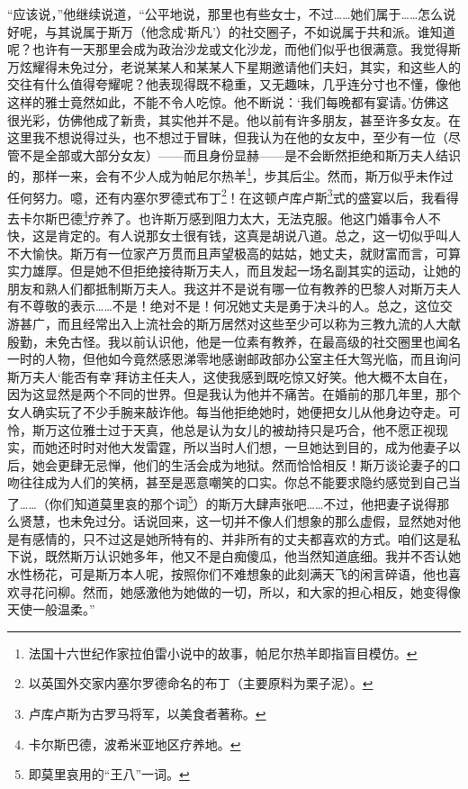 \par “应该说，”他继续说道，“公平地说，那里也有些女士，不过……她们属于……怎么说好呢，与其说属于斯万（他念成‘斯凡’）的社交圈子，不如说属于共和派。谁知道呢？也许有一天那里会成为政治沙龙或文化沙龙，而他们似乎也很满意。我觉得斯万炫耀得未免过分，老说某某人和某某人下星期邀请他们夫妇，其实，和这些人的交往有什么值得夸耀呢？他表现得既不稳重，又无趣味，几乎连分寸也不懂，像他这样的雅士竟然如此，不能不令人吃惊。他不断说：‘我们每晚都有宴请。’仿佛这很光彩，仿佛他成了新贵，其实他并不是。他以前有许多朋友，甚至许多女友。在这里我不想说得过头，也不想过于冒昧，但我认为在他的女友中，至少有一位（尽管不是全部或大部分女友）——而且身份显赫——是不会断然拒绝和斯万夫人结识的，那样一来，会有不少人成为帕尼尔热羊\footnote{法国十六世纪作家拉伯雷小说中的故事，帕尼尔热羊即指盲目模仿。}，步其后尘。然而，斯万似乎未作过任何努力。噫，还有内塞尔罗德式布丁\footnote{以英国外交家内塞尔罗德命名的布丁（主要原料为栗子泥）。}！在这顿卢库卢斯\footnote{卢库卢斯为古罗马将军，以美食者著称。}式的盛宴以后，我看得去卡尔斯巴德\footnote{卡尔斯巴德，波希米亚地区疗养地。}疗养了。也许斯万感到阻力太大，无法克服。他这门婚事令人不快，这是肯定的。有人说那女士很有钱，这真是胡说八道。总之，这一切似乎叫人不大愉快。斯万有一位家产万贯而且声望极高的姑姑，她丈夫，就财富而言，可算实力雄厚。但是她不但拒绝接待斯万夫人，而且发起一场名副其实的运动，让她的朋友和熟人们都抵制斯万夫人。我这并不是说有哪一位有教养的巴黎人对斯万夫人有不尊敬的表示……不是！绝对不是！何况她丈夫是勇于决斗的人。总之，这位交游甚广，而且经常出入上流社会的斯万居然对这些至少可以称为三教九流的人大献殷勤，未免古怪。我以前认识他，他是一位素有教养，在最高级的社交圈里也闻名一时的人物，但他如今竟然感恩涕零地感谢邮政部办公室主任大驾光临，而且询问斯万夫人‘能否有幸’拜访主任夫人，这使我感到既吃惊又好笑。他大概不太自在，因为这显然是两个不同的世界。但是我认为他并不痛苦。在婚前的那几年里，那个女人确实玩了不少手腕来敲诈他。每当他拒绝她时，她便把女儿从他身边夺走。可怜，斯万这位雅士过于天真，他总是认为女儿的被劫持只是巧合，他不愿正视现实，而她还时时对他大发雷霆，所以当时人们想，一旦她达到目的，成为他妻子以后，她会更肆无忌惮，他们的生活会成为地狱。然而恰恰相反！斯万谈论妻子的口吻往往成为人们的笑柄，甚至是恶意嘲笑的口实。你总不能要求隐约感觉到自己当了……（你们知道莫里哀的那个词\footnote{即莫里哀用的“王八”一词。}）的斯万大肆声张吧……不过，他把妻子说得那么贤慧，也未免过分。话说回来，这一切并不像人们想象的那么虚假，显然她对他是有感情的，只不过这是她所特有的、并非所有的丈夫都喜欢的方式。咱们这是私下说，既然斯万认识她多年，他又不是白痴傻瓜，他当然知道底细。我并不否认她水性杨花，可是斯万本人呢，按照你们不难想象的此刻满天飞的闲言碎语，他也喜欢寻花问柳。然而，她感激他为她做的一切，所以，和大家的担心相反，她变得像天使一般温柔。”
